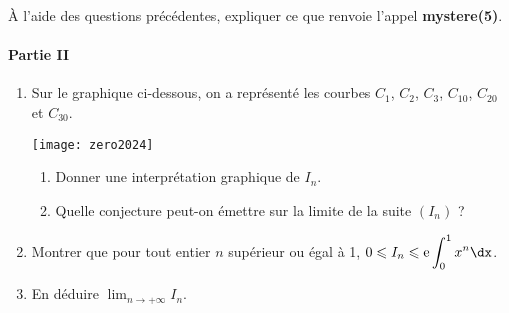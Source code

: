 \documentclass[11pt,fleqn, openany]{book} %
\begin{document}
\begin{exercise}[topic=int04, subtitle={(Sujet zéro 2024)}]
\begin{enumerate}


À l'aide des questions précédentes, expliquer ce que renvoie l'appel \textbf{mystere(5)}.

\end{enumerate}
\newpage 
\paragraph{Partie II}

\begin{enumerate}

\item Sur le graphique ci-dessous, on a représenté les courbes $C_1$, $C_2$, $C_3$, $C_{10}$, $C_{20}$ et $C_{30}$.
\begin{center}
\texttt{[image: zero2024]}
\end{center}
\begin{enumerate}
\item Donner une interprétation graphique de $I_n$.
\item Quelle conjecture peut-on émettre sur la limite de la suite $(I_n)$ ?
\end{enumerate}
\item Montrer que pour tout entier $n$ supérieur ou égal à 1, $0\leqslant I_n \leqslant \e \displaystyle\int_0^1x^n \dx$.
\item En déduire $\displaystyle\lim_{n \to +\infty}I_n$.
\end{enumerate}
\end{exercise}
\end{document}
